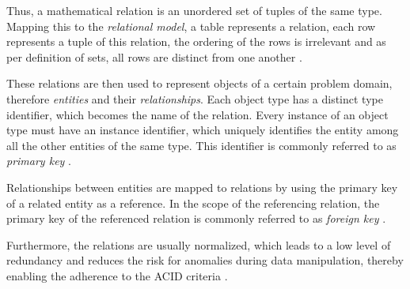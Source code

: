 Thus, a mathematical relation is an unordered set of tuples of the same type. Mapping this to the \emph{relational model}, a table represents a relation, each row represents a tuple of this relation, the ordering of the rows is irrelevant and as per definition of sets, all rows are distinct from one another \cite{RelationalDatabaseModel}.\par
These relations are then used to represent objects of a certain problem domain, therefore \emph{entities} and their \emph{relationships}. Each object type has a distinct type identifier, which becomes the name of the relation. Every instance of an object type must have an instance identifier, which uniquely identifies the entity among all the other entities of the same type. This identifier is commonly referred to as \emph{primary key} \cite{RelationalDatabaseModel}.\par
Relationships between entities are mapped to relations by using the primary key of a related entity as a reference. In the scope of the referencing relation, the primary key of the referenced relation is commonly referred to as \emph{foreign key} \cite{RelationalDatabaseModel}.\par
Furthermore, the relations are usually normalized, which leads to a low level of redundancy and reduces the risk for anomalies during data manipulation, thereby enabling the adherence to the ACID criteria \cite{RelationalDatabaseModel}.\\ %

